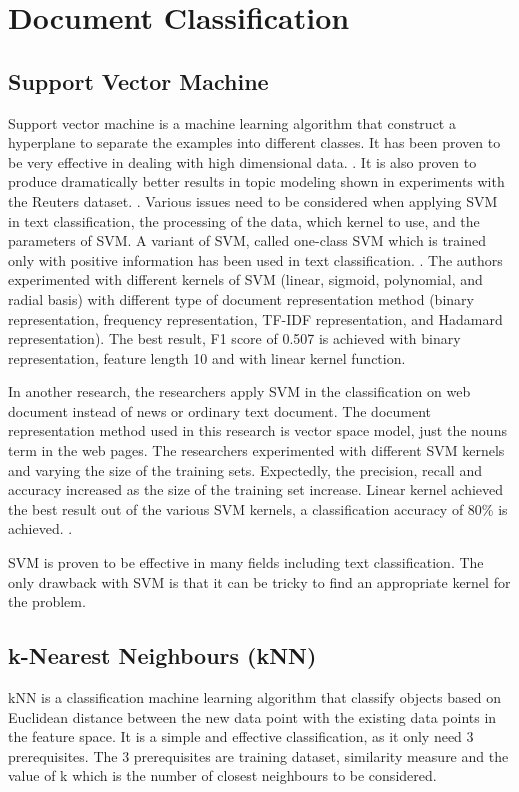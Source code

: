 \clearpage	
\section{Document Classification}
\subsection{Support Vector Machine}
Support vector machine is a machine learning algorithm that construct a hyperplane to separate the examples into different classes. It has been proven to be very effective in dealing with high dimensional data. \cite{webSvm}. It is also proven to produce dramatically better results in topic modeling shown in experiments with the Reuters dataset. \cite{inductiveText}. Various issues need to be considered when applying SVM in text classification, the processing of the data, which kernel to use, and the parameters of SVM. A variant of SVM, called one-class SVM which is trained only with positive information has been used in text classification. \cite{oneSvm}.  The authors experimented with different kernels of SVM (linear, sigmoid, polynomial, and radial basis) with different type of document representation method (binary representation, frequency representation, TF-IDF representation, and Hadamard representation). The best result, F1 score of 0.507 is achieved with binary representation, feature length 10 and with linear kernel function.  
	
In another research, the researchers apply SVM in the classification on web document instead of news or ordinary text document. The document representation method used in this research is vector space model, just the nouns term in the web pages. The researchers experimented with different SVM kernels and varying the size of the training sets. Expectedly, the precision, recall and accuracy increased as the size of the training set increase. Linear kernel achieved the best result out of the various SVM kernels, a classification accuracy of 80\% is achieved. \cite{webSvm}.
	
SVM is proven to be effective in many fields including text classification. The only drawback with SVM is that it can be tricky to find an appropriate kernel for the problem.


\clearpage
\subsection{k-Nearest Neighbours (kNN)}
kNN is a classification machine learning algorithm that classify objects based on Euclidean distance between the new data point with the existing data points in the feature space. It is a simple and effective classification, as it only need 3 prerequisites. The 3 prerequisites are training dataset, similarity measure and the value of k which is the number of closest neighbours to be considered. 

